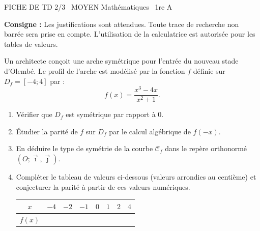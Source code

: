 \documentclass[11pt]{article}
\begin{document}
\begin{tcolorbox}[enhanced,colback=popink,colframe=popink,arc=10pt,boxrule=0pt,left=12pt,right=12pt,top=9pt,bottom=9pt]
{\color{white}\popxbold\small FICHE DE TD 2/3 \textbullet\ MOYEN \hfill Mathématiques \textbullet\ 1re A\par}
\end{tcolorbox}
\vspace{4pt}
\textbf{Consigne :} Les justifications sont attendues. Toute trace de recherche non barrée sera prise en compte. L'utilisation de la calculatrice est autorisée pour les tables de valeurs.

\begin{exercice}
Un architecte conçoit une arche symétrique pour l'entrée du nouveau stade d'Olembé. Le profil de l'arche est modélisé par la fonction $f$ définie sur $D_f = [-4 ; 4]$ par :
\[ f(x) = \frac{x^3 - 4x}{x^2 + 1}. \]
\begin{enumerate}
    \item Vérifier que $D_f$ est symétrique par rapport à $0$.
    \item Étudier la parité de $f$ sur $D_f$ par le calcul algébrique de $f(-x)$.
    \item En déduire le type de symétrie de la courbe $\mathcal{C}_f$ dans le repère orthonormé $(O; \vec{\imath}, \vec{\jmath})$.
    \item Compléter le tableau de valeurs ci-dessous (valeurs arrondies au centième) et conjecturer la parité à partir de ces valeurs numériques.
    \begin{center}
\begin{tabular}{|c|c|c|c|c|c|c|c|}
\hline
$x$ & $-4$ & $-2$ & $-1$ & $0$ & $1$ & $2$ & $4$ \\
\hline
$f(x)$ &  &  &  &  &  &  & \\
\hline
\end{tabular}
    \end{center}
\end{enumerate}
\end{exercice}
\end{document}
